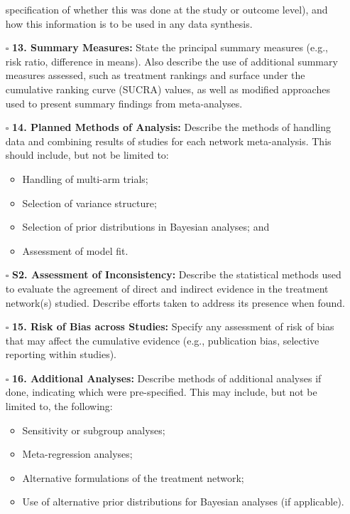 \documentclass[11pt]{article}
\def\tightlist{}
\begin{document}
\begin{Form}
\begin{itemize}
  specification of whether this was done at the study or outcome level),
  and how this information is to be used in any data synthesis.
\item[$\square$]
  \textbf{13. Summary Measures:} State the principal summary measures
  (e.g., risk ratio, difference in means). Also describe the use of
  additional summary measures assessed, such as treatment rankings and
  surface under the cumulative ranking curve (SUCRA) values, as well as
  modified approaches used to present summary findings from
  meta-analyses.
\item[$\square$]
  \textbf{14. Planned Methods of Analysis:} Describe the methods of
  handling data and combining results of studies for each network
  meta-analysis. This should include, but not be limited to:

  \begin{itemize}
  \tightlist
  \item
    Handling of multi-arm trials;
  \item
    Selection of variance structure;
  \item
    Selection of prior distributions in Bayesian analyses; and
  \item
    Assessment of model fit.
  \end{itemize}
\item[$\square$]
  \textbf{S2. Assessment of Inconsistency:} Describe the statistical
  methods used to evaluate the agreement of direct and indirect evidence
  in the treatment network(s) studied. Describe efforts taken to address
  its presence when found.
\item[$\square$]
  \textbf{15. Risk of Bias across Studies:} Specify any assessment of
  risk of bias that may affect the cumulative evidence (e.g.,
  publication bias, selective reporting within studies).
\item[$\square$]
  \textbf{16. Additional Analyses:} Describe methods of additional
  analyses if done, indicating which were pre-specified. This may
  include, but not be limited to, the following:

  \begin{itemize}
  \tightlist
  \item
    Sensitivity or subgroup analyses;
  \item
    Meta-regression analyses;
  \item
    Alternative formulations of the treatment network;
  \item
    Use of alternative prior distributions for Bayesian analyses (if
    applicable).
  \end{itemize}
\end{itemize}


\end{Form}
\end{document}
